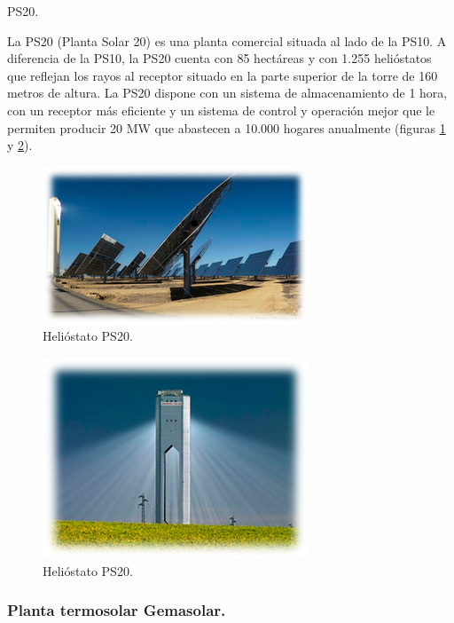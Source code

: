 \cite{JonathanWebSite}



PS20.

La PS20 (Planta Solar 20) es una planta comercial situada al lado de la PS10.
A diferencia de la PS10, la PS20 cuenta con 85 hectáreas y con 1.255 helióstatos que reflejan los rayos al receptor situado en la parte superior de la torre de 160 metros de altura.
La PS20 dispone con un sistema de almacenamiento de 1 hora, con un receptor más eficiente y un sistema de control y operación mejor que le permiten producir 20 MW que abastecen a 10.000 hogares anualmente (figuras \ref{fig:FotosPaginasWebHeliostatos/unnamed(2).png} y \ref{fig:FotosPaginasWebHeliostatos/unnamed(3).png}).

\begin{figure}[h!]
  	\centering
	\includegraphics[scale=1]{FotosPaginasWebHeliostatos/unnamed(2).png}
	\caption{Helióstato PS20.
	\label{fig:FotosPaginasWebHeliostatos/unnamed(2).png}}
\end{figure}

\begin{figure}[h!]
  	\centering
	\includegraphics[scale=1]{FotosPaginasWebHeliostatos/unnamed(3).png}
	\caption{Helióstato PS20.
	\label{fig:FotosPaginasWebHeliostatos/unnamed(3).png}}
\end{figure}

\cite{ValenticampderrosWebSite}

\subsubsection{Planta termosolar Gemasolar.}

